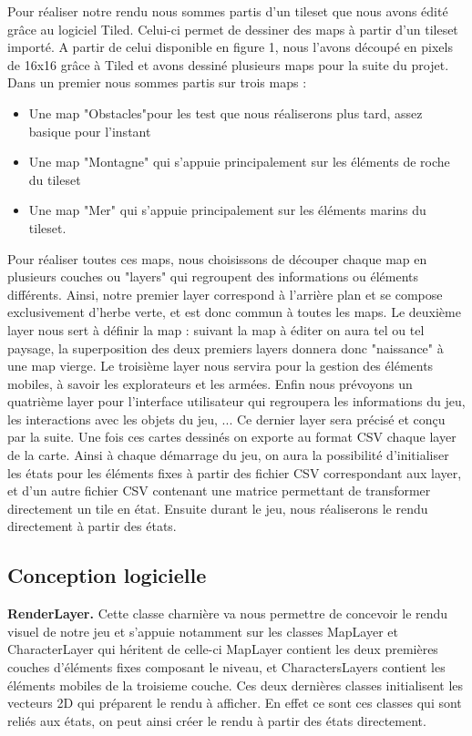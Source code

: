 \documentclass[a4paper,12pt]{article}
\begin{document}
Pour réaliser notre rendu nous sommes partis d'un tileset que nous avons édité grâce au logiciel Tiled. Celui-ci permet de dessiner des maps à partir d'un tileset importé. A partir de celui disponible en figure 1, nous l'avons découpé en pixels de 16x16 grâce à Tiled et avons dessiné plusieurs maps pour la suite du projet.
\\Dans un premier nous sommes partis sur trois maps : \begin{itemize}
\item Une map "Obstacles"pour les test que nous réaliserons plus tard, assez basique pour l'instant
\item Une map "Montagne" qui s'appuie principalement sur les éléments de roche du tileset
\item Une map "Mer" qui s'appuie principalement sur les éléments marins du tileset.
\end{itemize}

Pour réaliser toutes ces maps, nous choisissons de découper chaque map en plusieurs couches ou "layers" qui regroupent des informations ou éléments différents. Ainsi, notre premier layer correspond à l'arrière plan et se compose exclusivement d'herbe verte, et est donc commun à toutes les maps. Le deuxième layer nous sert à définir la map : suivant la map à éditer on aura tel ou tel paysage, la superposition des deux premiers layers donnera donc "naissance" à une map vierge. Le troisième layer nous servira pour la gestion des éléments mobiles, à savoir les explorateurs et les armées. Enfin nous prévoyons un quatrième layer pour l'interface utilisateur qui regroupera les informations du jeu, les interactions avec les objets du jeu, ... Ce dernier layer sera précisé et conçu par la suite. 
Une fois ces cartes dessinés on exporte au format CSV chaque layer de la carte. Ainsi à chaque démarrage du jeu, on aura la possibilité d'initialiser les états pour les éléments fixes à partir des fichier CSV correspondant aux layer, et d'un autre fichier CSV contenant une matrice permettant de transformer directement un tile en état. 
Ensuite durant le jeu, nous réaliserons le rendu directement à partir des états.

\subsection{Conception logicielle}

\textbf{RenderLayer.}
 Cette classe charnière va nous permettre de concevoir le rendu visuel de notre jeu et s'appuie notamment sur les classes MapLayer et CharacterLayer qui héritent de celle-ci MapLayer contient les deux premières couches d'éléments fixes composant le niveau, et CharactersLayers contient les éléments mobiles de la troisieme couche. Ces deux dernières classes initialisent les vecteurs 2D qui préparent le rendu à afficher. En effet ce sont ces classes qui sont reliés aux états, on peut ainsi créer le rendu à partir des états directement. 
 \\
 
\end{document}

